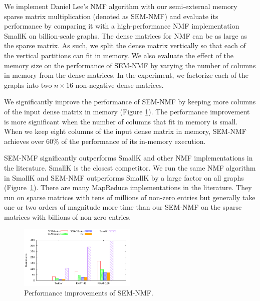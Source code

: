 \documentclass[simplex.tex]{subfiles}
\begin{document}
We implement Daniel Lee’s NMF algorithm with our semi-external memory
sparse matrix multiplication (denoted as SEM-NMF) and evaluate its
performance by comparing it with a high-performance NMF implementation
SmallK on billion-scale graphs. The dense matrices for NMF can be as
large as the sparse matrix. As such, we split the dense matrix
vertically so that each of the vertical partitions can fit in memory. We
also evaluate the effect of the memory size on the performance of
SEM-NMF by varying the number of columns in memory from the dense
matrices. In the experiment, we factorize each of the graphs
into two $n \times 16$ non-negative dense matrices.


We significantly improve the performance of SEM-NMF by keeping more
columns of the input dense matrix in memory (Figure \ref{fig:nmf}). The
performance improvement is more significant when the number of columns
that fit in memory is small. When we keep eight columns of the input
dense matrix in memory, SEM-NMF achieves over 60\% of the performance of
its in-memory execution.


SEM-NMF significantly outperforms SmallK and other NMF implementations
in the literature. SmallK is the closest competitor. We run the same NMF
algorithm in SmallK and SEM-NMF outperforms SmallK by a large factor on
all graphs (Figure~\ref{fig:nmf}). There are many MapReduce
implementations in the literature. They run on sparse matrices with tens
of millions of non-zero entries but generally take one or two orders of
magnitude more time than our SEM-NMF on the sparse matrices with
billions of non-zero entries.


\begin{figure}[h!]
\begin{cframed}
\centering
\includegraphics[width=0.5\textwidth]{./figs/nmf.png}
\caption{
Performance improvements of SEM-NMF.
}
\label{fig:nmf}
\end{cframed}
\end{figure}
\end{document}
